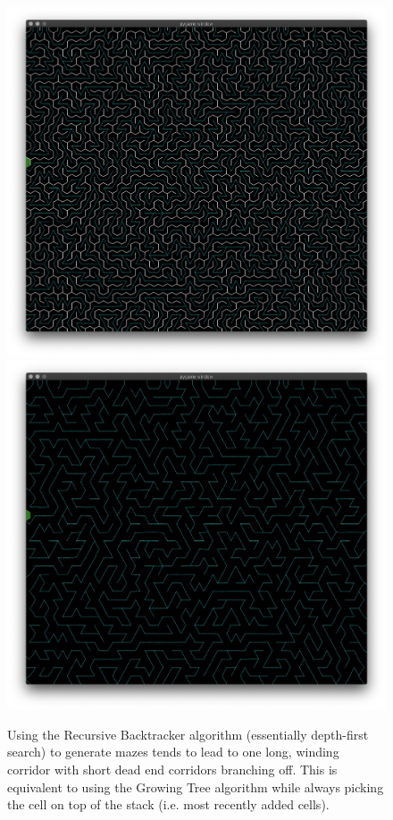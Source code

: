 \documentclass[a4paper,12pt]{article}
\begin{document}
\begin{figure}[ht]
  \centering
  \includegraphics[width=0.7\linewidth]{images/maze-dfs.png}
  \includegraphics[width=0.7\linewidth]{images/maze-dfs-connections.png}
  \caption{Using the Recursive Backtracker algorithm (essentially depth-first
    search) to generate mazes tends to lead to one long, winding corridor with
    short dead end corridors branching off. This is equivalent to using the
    Growing Tree algorithm while always picking the cell on top of the stack
    (i.e. most recently added cells).
  \label{fig:maze-dfs}}
\end{figure}
\end{document}
